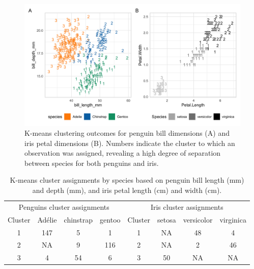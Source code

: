 \begin{Schunk}
\begin{figure}[htbp]

{\centering \includegraphics[width=6in]{fig/kmeans} 

}

\caption[K-means clustering outcomes for penguin bill dimensions (A) and iris petal dimensions (B)]{K-means clustering outcomes for penguin bill dimensions (A) and iris petal dimensions (B). Numbers indicate the cluster to which an observation was assigned, revealing a high degree of separation between species for both penguins and iris.}\label{fig:kmeans}
\end{figure}
\end{Schunk}

\begin{Schunk}
\begin{table}

\caption{\label{tab:unnamed-chunk-3}K-means cluster assignments by species based on penguin bill length (mm) and depth (mm), and iris petal length (cm) and width (cm).}
\centering
\begin{tabular}[t]{c|c|c|c|c|c|c|c}
\hline
\multicolumn{4}{c|}{Penguins cluster assignments} & \multicolumn{4}{c}{Iris cluster assignments} \\
\cline{1-4} \cline{5-8}
Cluster & Adélie & chinstrap & gentoo & Cluster & setosa & versicolor & virginica\\
\hline
1 & 147 & 5 & 1 & 1 & NA & 48 & 4\\
\hline
2 & NA & 9 & 116 & 2 & NA & 2 & 46\\
\hline
3 & 4 & 54 & 6 & 3 & 50 & NA & NA\\
\hline
\end{tabular}
\end{table}

\end{Schunk}

